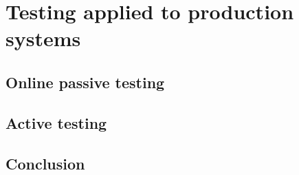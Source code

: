 %
\chapter{Testing applied to production systems}
\label{sec:testing}




\section{Online passive testing}
\label{sec:testing:onpassive}

\section{Active testing}
\label{sec:testing:active}

\section{Conclusion}
\label{sec:testing:conclusion}
